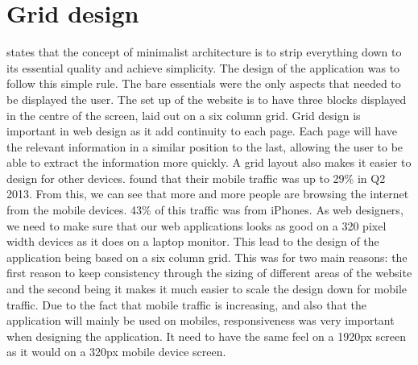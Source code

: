 \section{Grid design}
\citet{bertoni:2002} states that the concept of minimalist architecture is to strip everything down to its essential quality and achieve simplicity. The design of the application was to follow this simple rule. The bare essentials were the only aspects that needed to be displayed the user. The set up of the website is to have three blocks displayed in the centre of the screen, laid out on a six column grid. Grid design is important in web design as it add continuity to each page. Each page will have the relevant information in a similar position to the last, allowing the user to be able to extract the information more quickly. A grid layout also makes it easier to design for other devices. \citet{walkers:2013} found that their mobile traffic was up to 29\% in Q2 2013. From this, we can see that more and more people are browsing the internet from the mobile devices. 43\% of this traffic was from iPhones. As web designers, we need to make sure that our web applications looks as good on a 320 pixel width devices as it does on a laptop monitor. This lead to the design of the application being based on a six column grid. This was for two main reasons: the first reason to keep consistency through the sizing of different areas of the website and the second being it makes it much easier to scale the design down for mobile traffic. Due to the fact that mobile traffic is increasing, and also that the application will mainly be used on mobiles, responsiveness was very important when designing the application. It need to have the same feel on a 1920px screen as it would on a 320px mobile device screen.\\


